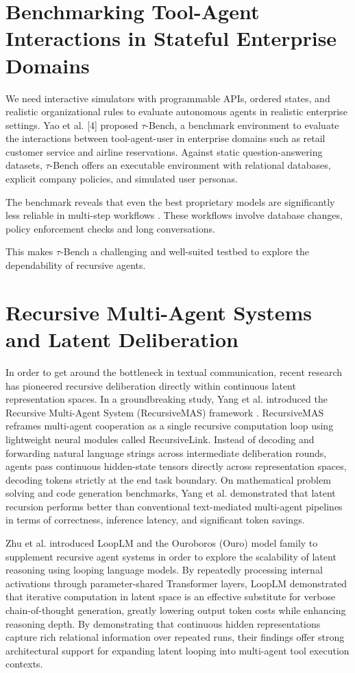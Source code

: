 \documentclass[a4paper, 12pt]{report}
\begin{document}
\section{Benchmarking Tool-Agent Interactions in Stateful Enterprise Domains}
We need interactive simulators with programmable APIs, ordered states, and realistic organizational rules to evaluate autonomous agents in realistic enterprise settings. Yao et al. [4] proposed $\tau$-Bench, a benchmark environment to evaluate the interactions between tool-agent-user in enterprise domains such as retail customer service and airline reservations. Against static question-answering datasets, $\tau$-Bench offers an executable environment with relational databases, explicit company policies, and simulated user personas.

The benchmark reveals that even the best proprietary models are significantly less reliable in multi-step workflows . These workflows involve database changes, policy enforcement checks and long conversations.

This makes $\tau$-Bench a challenging and well-suited testbed to explore the dependability of recursive agents.

\section{Recursive Multi-Agent Systems and Latent Deliberation}
In order to get around the bottleneck in textual communication, recent research has pioneered recursive deliberation directly within continuous latent representation spaces. In a groundbreaking study, Yang et al. introduced the Recursive Multi-Agent System (RecursiveMAS) framework \cite{zou2026recursive}. RecursiveMAS reframes multi-agent cooperation as a single recursive computation loop using lightweight neural modules called RecursiveLink. Instead of decoding and forwarding natural language strings across intermediate deliberation rounds, agents pass continuous hidden-state tensors directly across representation spaces, decoding tokens strictly at the end task boundary. On mathematical problem solving and code generation benchmarks, Yang et al. demonstrated that latent recursion performs better than conventional text-mediated multi-agent pipelines in terms of correctness, inference latency, and significant token savings.

Zhu et al. \cite{zhu2025looplm} introduced LoopLM and the Ouroboros (Ouro) model family to supplement recursive agent systems in order to explore the scalability of latent reasoning using looping language models. By repeatedly processing internal activations through parameter-shared Transformer layers, LoopLM demonstrated that iterative computation in latent space is an effective substitute for verbose chain-of-thought generation, greatly lowering output token costs while enhancing reasoning depth. By demonstrating that continuous hidden representations capture rich relational information over repeated runs, their findings offer strong architectural support for expanding latent looping into multi-agent tool execution contexts.
\end{document}
